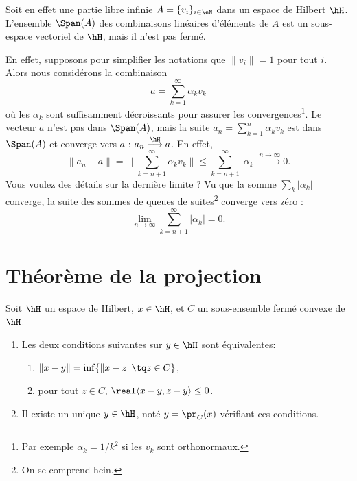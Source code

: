Soit en effet une partie libre infinie \( A=\{ v_i \}_{i\in \eN}\) dans un espace de Hilbert \( \hH\). L'ensemble $\Span(A)$ des combinaisons linéaires d'éléments de \( A\) est un sous-espace vectoriel de \( \hH\), mais il n'est pas fermé.

En effet, supposons pour simplifier les notations que \( \| v_i \|=1\) pour tout \( i\). Alors nous considérons la combinaison
\begin{equation}
    a=\sum_{k=1}^{\infty}\alpha_kv_k
\end{equation}
où les \( \alpha_k\) sont suffisamment décroissants pour assurer les convergences\footnote{Par exemple \( \alpha_k=1/k^2\) si les \( v_k\) sont orthonormaux.}. Le vecteur \( a\) n'est pas dans \( \Span(A)\), mais la suite \( a_n=\sum_{k=1}^{n}\alpha_kv_k\) est dans \( \Span(A)\) et converge vers \( a\) : \( a_n\stackrel{\hH}{\longrightarrow}a\). En effet,
\begin{equation}
    \| a_n-a \|=\| \sum_{k=n+1}^{\infty}\alpha_kv_k \|\leq \sum_{k=n+1}^{\infty}| \alpha_k | \stackrel{n\to\infty}{\longrightarrow}0.
\end{equation}
Vous voulez des détails sur la dernière limite ? Vu que la somme \( \sum_k| \alpha_k |\) converge, la suite des sommes de queues de suites\footnote{On se comprend hein.} converge vers zéro :
\begin{equation}
    \lim_{n\to \infty} \sum_{k=n+1}^{\infty}| \alpha_k |=0.
\end{equation}

\section{Théorème de la projection}

\begin{theorem} \label{ThoProjOrthuzcYkz}
    Soit \( \hH\) un espace de Hilbert, \( x\in \hH\), et \( C\) un sous-ensemble fermé convexe de \( \hH\).
    \begin{enumerate}
        \item
            Les deux conditions suivantes sur \( y\in \hH\) sont équivalentes:
    \begin{enumerate}
        \item   \label{ETsfYCSItemi}
            \( \| x-y \|=\inf\{ \| x-z \|\tq z\in C \}\),
        \item\label{ETsfYCSItemii}
            pour tout \( z\in C\), \( \real\langle x-y, z-y\rangle \leq 0\).
    \end{enumerate}
\item
    Il existe un unique \( y\in \hH\), noté \( y=\pr_C(x)\) vérifiant ces conditions.
    \end{enumerate}
\end{theorem}

